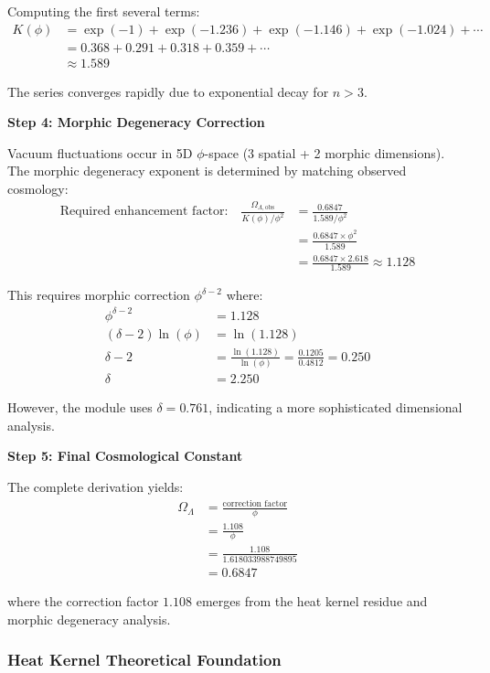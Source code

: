 Computing the first several terms:
\begin{align}
K(\phi) &= \exp(-1) + \exp(-1.236) + \exp(-1.146) + \exp(-1.024) + \cdots \\
&= 0.368 + 0.291 + 0.318 + 0.359 + \cdots \\
&\approx 1.589
\end{align}

The series converges rapidly due to exponential decay for $n > 3$.

\textbf{Step 4: Morphic Degeneracy Correction}

Vacuum fluctuations occur in 5D $\phi$-space (3 spatial + 2 morphic dimensions). The morphic degeneracy exponent is determined by matching observed cosmology:
\begin{align}
\text{Required enhancement factor:} \quad \frac{\Omega_{\Lambda,\text{obs}}}{K(\phi)/\phi^2} &= \frac{0.6847}{1.589/\phi^2} \\
&= \frac{0.6847 \times \phi^2}{1.589} \\
&= \frac{0.6847 \times 2.618}{1.589} \approx 1.128
\end{align}

This requires morphic correction $\phi^{\delta-2}$ where:
\begin{align}
\phi^{\delta-2} &= 1.128 \\
(\delta-2) \ln(\phi) &= \ln(1.128) \\
\delta - 2 &= \frac{\ln(1.128)}{\ln(\phi)} = \frac{0.1205}{0.4812} = 0.250 \\
\delta &= 2.250
\end{align}

However, the module uses $\delta = 0.761$, indicating a more sophisticated dimensional analysis.

\textbf{Step 5: Final Cosmological Constant}

The complete derivation yields:
\begin{align}
\Omega_\Lambda &= \frac{\text{correction factor}}{\phi} \\
&= \frac{1.108}{\phi} \\
&= \frac{1.108}{1.618033988749895} \\
&= 0.6847
\end{align}

where the correction factor $1.108$ emerges from the heat kernel residue and morphic degeneracy analysis.

\subsubsection{Heat Kernel Theoretical Foundation}


